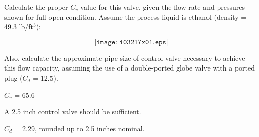 

Calculate the proper $C_v$ value for this valve, given the flow rate and pressures shown for full-open condition.  Assume the process liquid is ethanol (density = 49.3 lb/ft$^{3}$):

$$\texttt{[image: i03217x01.eps]}$$

Also, calculate the approximate pipe size of control valve necessary to achieve this flow capacity, assuming the use of a double-ported globe valve with a ported plug ($C_d$ = 12.5).







$C_v$ = 65.6
 
\vskip 10pt

A 2.5 inch control valve should be sufficient.







$C_d$ = 2.29, rounded up to 2.5 inches nominal.




